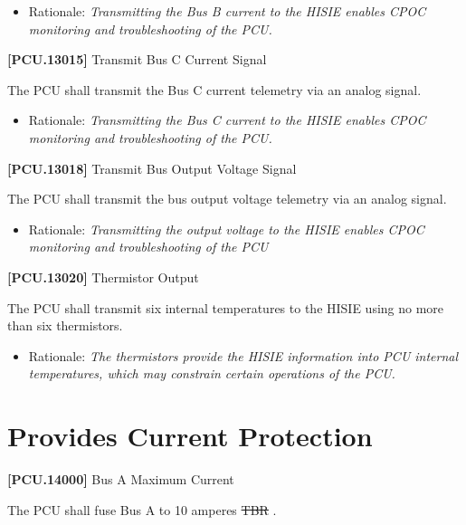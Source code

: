 \documentclass[12pt,oneside,oldfontcommands]{memoir}
\providecommand{\DIFaddtex}[1]{{\protect\color{blue}\uwave{#1}}} %
\providecommand{\DIFdeltex}[1]{{\protect\color{red}\sout{#1}}}                      %
\providecommand{\DIFaddbegin}{} %
\providecommand{\DIFaddend}{} %
\providecommand{\DIFdelbegin}{} %
\providecommand{\DIFdelend}{} %
\providecommand{\DIFadd}[1]{\texorpdfstring{\DIFaddtex{#1}}{#1}} %
\providecommand{\DIFdel}[1]{\texorpdfstring{\DIFdeltex{#1}}{}} %
\newcommand{\DIFscaledelfig}{0.5}
\newlength{\DIFdelgraphicswidth} %
\newlength{\DIFdelgraphicsheight} %
\newcommand{\DIFaddincludegraphics}[2][]{{\color{blue}\fbox{\DIFOincludegraphics[#1]{#2}}}} %
\newcommand{\DIFdelincludegraphics}[2][]{%
\sbox{\DIFdelgraphicsbox}{\DIFOincludegraphics[#1]{#2}}%
\settoboxwidth{\DIFdelgraphicswidth}{\DIFdelgraphicsbox} %
\settoboxtotalheight{\DIFdelgraphicsheight}{\DIFdelgraphicsbox} %
\scalebox{\DIFscaledelfig}{%
\parbox[b]{\DIFdelgraphicswidth}{\usebox{\DIFdelgraphicsbox}\\[-\baselineskip] \rule{\DIFdelgraphicswidth}{0em}}\llap{\resizebox{\DIFdelgraphicswidth}{\DIFdelgraphicsheight}{%
\setlength{\unitlength}{\DIFdelgraphicswidth}%
\begin{picture}(1,1)%
\thicklines\linethickness{2pt} %
{\color[rgb]{1,0,0}\put(0,0){\framebox(1,1){}}}%
{\color[rgb]{1,0,0}\put(0,0){\line( 1,1){1}}}%
{\color[rgb]{1,0,0}\put(0,1){\line(1,-1){1}}}%
\end{picture}%
}\hspace*{3pt}}} %
} %
\DeclareRobustCommand{\DIFaddbegin}{\DIFOaddbegin \let\includegraphics\DIFaddincludegraphics} %
\DeclareRobustCommand{\DIFaddend}{\DIFOaddend \let\includegraphics\DIFOincludegraphics} %
\DeclareRobustCommand{\DIFdelbegin}{\DIFOdelbegin \let\includegraphics\DIFdelincludegraphics} %
\DeclareRobustCommand{\DIFdelend}{\DIFOaddend \let\includegraphics\DIFOincludegraphics} %
\begin{document}
\begin{itemize}
\item{} Rationale: \emph{Transmitting the Bus B current to the HISIE enables CPOC monitoring and troubleshooting of the PCU.}

\end{itemize}

\textbf{[PCU.13015]} Transmit Bus C Current Signal

The \gls{PCU} shall transmit the Bus C current telemetry via an analog signal.

\begin{itemize}
\item{} Rationale: \emph{Transmitting the Bus C current to the HISIE enables CPOC monitoring and troubleshooting of the PCU.}

\end{itemize}

\textbf{[PCU.13018]} Transmit Bus Output Voltage Signal

The \gls{PCU} shall transmit the bus output voltage telemetry via an analog signal.

\begin{itemize}
\item{} Rationale: \emph{Transmitting the output voltage to the HISIE enables CPOC monitoring and troubleshooting of the PCU}

\end{itemize}

\textbf{[PCU.13020]} Thermistor Output

The \gls{PCU} shall transmit six internal temperatures to the \gls{HISIE} using no more than six thermistors.

\begin{itemize}
\item{} Rationale: \emph{The thermistors provide the HISIE information into PCU internal temperatures, which may constrain certain operations of the PCU.}

\end{itemize}

\section{Provides Current Protection}
\label{providescurrentprotection}

\textbf{[PCU.14000]} Bus A Maximum Current

The \gls{PCU} shall fuse Bus A to 10 amperes \DIFdelbegin \DIFdel{TBR}%
\DIFdelend \DIFaddbegin \DIFadd{(TBR}\label{tbx_7}\DIFadd{)}\DIFaddend .
\end{document}
